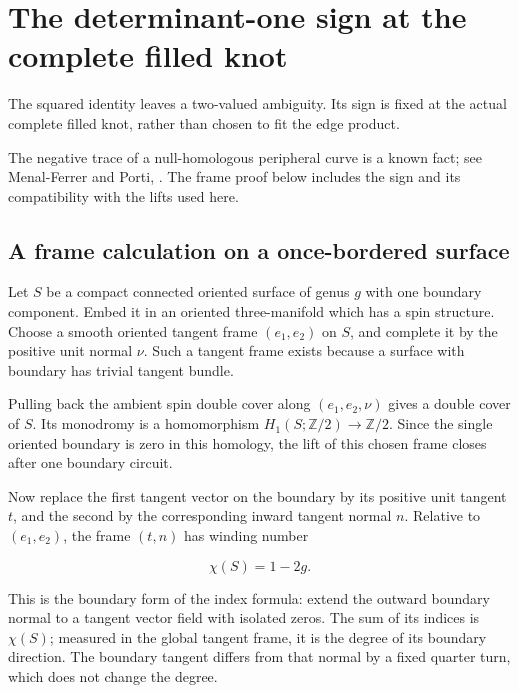 \section{The determinant-one sign at the complete filled knot}\label{pl:the-determinant-one-sign-at-the-complete-filled-knot}

The squared identity leaves a two-valued ambiguity. Its sign is
fixed at the actual complete filled knot, rather than chosen
to fit the edge product.

The negative trace of a null-homologous peripheral curve is a known
fact; see Menal-Ferrer and Porti,
\cite[Corollary 3.10]{MFP}.
The frame proof below includes the sign and its compatibility with
the lifts used here.

\subsection{A frame calculation on a once-bordered surface}\label{pl:a-frame-calculation-on-a-once-bordered-surface}

Let \(S\) be a compact connected oriented surface of genus \(g\)
with one boundary component. Embed it in an oriented three-manifold
which has a spin structure. Choose a smooth oriented tangent frame
\((e_1,e_2)\) on \(S\), and complete it by the positive unit normal
\(\nu\). Such a tangent frame exists because a surface with
boundary has trivial tangent bundle.

Pulling back the ambient spin double cover along
\((e_1,e_2,\nu)\) gives a double cover of \(S\).
Its monodromy is a homomorphism
\(H_1(S;\mathbb Z/2)\to\mathbb Z/2\).
Since the single oriented boundary is zero in this homology,
the lift of this chosen frame closes after one boundary circuit.

Now replace the first tangent vector on the boundary by its positive
unit tangent \(t\), and the second by the corresponding inward
tangent normal \(n\). Relative to \((e_1,e_2)\), the
frame \((t,n)\) has winding number

\begin{equation}\label{pl:L1}
\chi(S)=1-2g.
\end{equation}

This is the boundary form of the index formula: extend the outward
boundary normal to a tangent vector field with isolated zeros.
The sum of its indices is \(\chi(S)\); measured in the
global tangent frame, it is the degree of its boundary direction.
The boundary tangent differs from that normal by a fixed quarter
turn, which does not change the degree.


